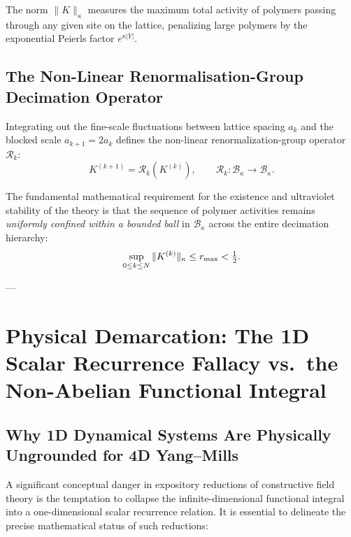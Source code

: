 The norm $\|K\|_\kappa$ measures the maximum total activity of polymers passing through any given site on the lattice, penalizing large polymers by the exponential Peierls factor $e^{\kappa |Y|}$.

\subsection{The Non-Linear Renormalisation-Group Decimation Operator}
\label{subsec:decimation_operator_b_kappa}

Integrating out the fine-scale fluctuations between lattice spacing $a_k$ and the blocked scale $a_{k+1} = 2 a_k$ defines the non-linear renormalization-group operator $\mathcal{R}_k$:
\begin{equation}
\label{eq:ch14_decimation_operator_map}
K^{(k+1)} = \mathcal{R}_k\left( K^{(k)} \right), \qquad \mathcal{R}_k : \mathcal{B}_\kappa \to \mathcal{B}_\kappa.
\end{equation}

The fundamental mathematical requirement for the existence and ultraviolet stability of the theory is that the sequence of polymer activities remains \emph{uniformly confined within a bounded ball} in $\mathcal{B}_\kappa$ across the entire decimation hierarchy:
\begin{equation}
\label{eq:uniform_polymer_bound_condition}
\sup_{0 \le k \le N} \|K^{(k)}\|_\kappa \le r_{\max} < \tfrac{1}{2}.
\end{equation}

---

\section{Physical Demarcation: The 1D Scalar Recurrence Fallacy vs.\ the Non-Abelian Functional Integral}
\label{sec:scalar_fallacy_demarcation}

\subsection{Why 1D Dynamical Systems Are Physically Ungrounded for 4D Yang--Mills}
\label{subsec:1d_fallacy_detailed}

A significant conceptual danger in expository reductions of constructive field theory is the temptation to collapse the infinite-dimensional functional integral into a one-dimensional scalar recurrence relation. It is essential to delineate the precise mathematical status of such reductions:


